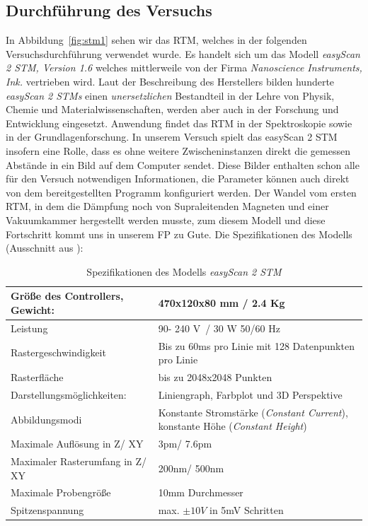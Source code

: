 \subsection{Durchführung des Versuchs}
In Abbildung~\ref{fig:stm1} sehen wir das RTM, welches in der
folgenden Versuchsdurchführung verwendet wurde. Es handelt sich
um das Modell \textit{easyScan 2 STM, Version 1.6} welches 
mittlerweile von 
der Firma \textit{Nanoscience Instruments, Ink.} vertrieben wird.
Laut der Beschreibung des Herstellers  
bilden hunderte \textit{easyScan 2 STMs} einen
\textit{unersetzlichen} Bestandteil in der Lehre von Physik,
Chemie und Materialwissenschaften, werden aber auch in der
Forschung und Entwicklung eingesetzt. Anwendung findet das RTM
in der Spektroskopie sowie in der Grundlagenforschung.
In unserem Versuch spielt das easyScan 2 STM insofern eine Rolle,
dass es ohne weitere Zwischeninstanzen direkt die gemessen
Abstände in ein Bild auf dem Computer sendet. Diese Bilder
enthalten schon alle für den Versuch notwendigen Informationen,
die Parameter können auch direkt von dem bereitgestellten Programm
konfiguriert werden. Der Wandel vom ersten RTM, in dem die Dämpfung
noch von Supraleitenden Magneten und einer Vakuumkammer hergestellt
werden musste, zum diesem Modell und diese Fortschritt kommt uns
in unserem FP zu Gute. Die Spezifikationen des Modells 
(Ausschnitt aus \cite{easyscan2_STM}):\\
\begin{table}[h]
\begin{tabular}{| l | p{7cm} |}
\hline
  Größe des Controllers, Gewicht: & 470x120x80 mm / 2.4 Kg\\ \hline
  Leistung & 90- 240 V~/ 30 W 50/60 Hz \\ \hline
  Rastergeschwindigkeit & Bis zu 60ms pro Linie mit 128 Datenpunkten  pro Linie \\ \hline
Rasterfläche & bis zu 2048x2048 Punkten \\ \hline 
Darstellungsmöglichkeiten: & Liniengraph, Farbplot und 3D Perspektive \\ \hline
Abbildungsmodi & Konstante Stromstärke (\textit{Constant Current}),
konstante Höhe (\textit{Constant Height}) \\ \hline
Maximale Auflösung in Z/ XY & 3pm/ 7.6pm \\ \hline
Maximaler Rasterumfang in Z/ XY & 200nm/ 500nm  \\ \hline
Maximale Probengröße & 10mm Durchmesser \\ \hline
Spitzenspannung & max. $\pm 10V$ in 5mV Schritten \\ \hline
\end{tabular}
\caption{Spezifikationen des Modells \textit{easyScan 2 STM} \cite{easyscan2_STM}}
\label{tab:STM}
\end{table}


